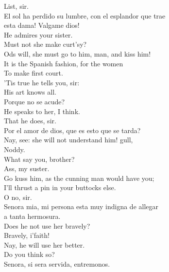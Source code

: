 \documentclass{memoir}
\begin{document}
\begin{drama*}
\facespeaks  List, sir.\\
\surlyspeaks {} El sol ha perdido su lumbre, con el esplandor que trae\\
 esta dama! Valgame dios!\\
\facespeaks {} He admires your sister.\\
\kastrilspeaks  Must not she make curt'sy?\\
\subtlespeaks {} Ods will, she must go to him, man, and kiss him!\\
 It is the Spanish fashion, for the women\\
 To make first court.\\
\facespeaks {} 'Tis true he tells you, sir:\\
 His art knows all.\\
\surlyspeaks {} Porque no se acude?\\
\kastrilspeaks  He speaks to her, I think.\\
\facespeaks {} That he does, sir.\\
\surlyspeaks  Por el amor de dios, que es esto que se tarda?\\
\kastrilspeaks  Nay, see: she will not understand him! gull,\\
 Noddy.\\
\pliantspeaks {} What say you, brother?\\
\kastrilspeaks {} Ass, my suster.\\
 Go kuss him, as the cunning man would have you;\\
 I'll thrust a pin in your buttocks else.\\
\facespeaks {} O no, sir.\\
\surlyspeaks  Senora mia, mi persona esta muy indigna de allegar\\
 a tanta hermosura.\\
\facespeaks {} Does he not use her bravely?\\
\kastrilspeaks  Bravely, i'faith!\\
\facespeaks {} Nay, he will use her better.\\
\kastrilspeaks  Do you think so?\\
\surlyspeaks {} Senora, si sera servida, entremonos.\\

\end{drama*}
\end{document}
